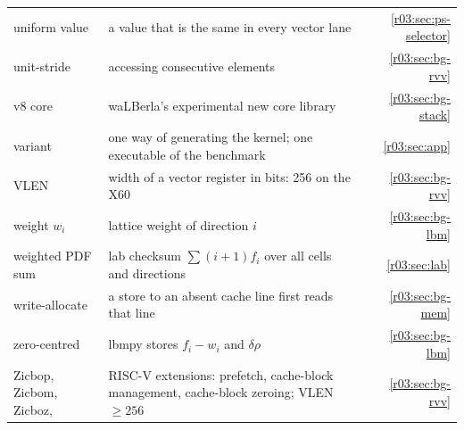 \begin{xltabular}{\linewidth}{@{}>{\raggedright\arraybackslash}p{3.6cm}>{\raggedright\arraybackslash}Xr@{}}
  uniform value & a value that is the same in every vector lane & \ref{r03:sec:ps-selector}\\
  unit-stride & accessing consecutive elements & \ref{r03:sec:bg-rvv}\\
  v8 core & waLBerla's experimental new core library & \ref{r03:sec:bg-stack}\\
  variant & one way of generating the kernel; one executable of the benchmark & \ref{r03:sec:app}\\
  VLEN & width of a vector register in bits: 256 on the X60 & \ref{r03:sec:bg-rvv}\\
  weight $w_i$ & lattice weight of direction $i$ & \ref{r03:sec:bg-lbm}\\
  weighted PDF sum & lab checksum $\sum (i+1) f_i$ over all cells and directions &
    \ref{r03:sec:lab}\\
  write-allocate & a store to an absent cache line first reads that line & \ref{r03:sec:bg-mem}\\
  zero-centred & lbmpy stores $f_i - w_i$ and $\delta\rho$ & \ref{r03:sec:bg-lbm}\\
  Zicbop, Zicbom, Zicboz,  & RISC-V extensions: prefetch, cache-block management,
    cache-block zeroing; VLEN $\ge 256$ & \ref{r03:sec:bg-rvv}\\
  \bottomrule
\end{xltabular}
